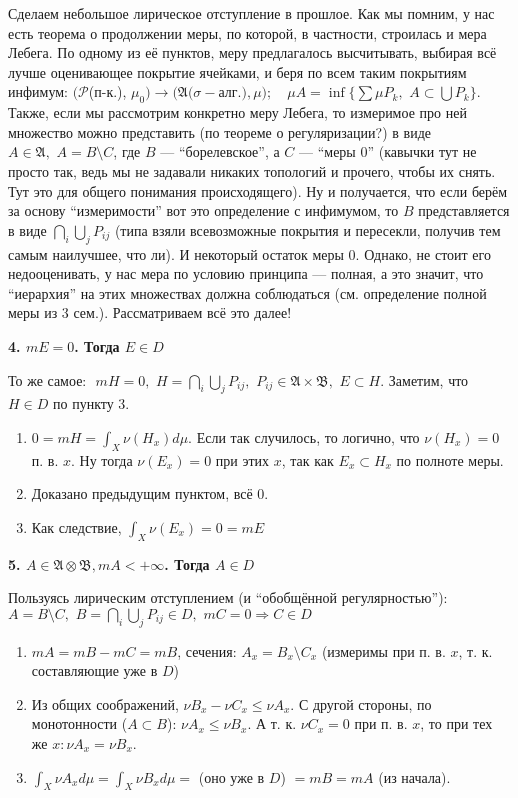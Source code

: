 \documentclass{article}
\def\dbl{\,\,}
\begin{document}
Сделаем небольшое лирическое отступление в прошлое. Как мы помним, у нас есть теорема о продолжении меры, по которой, в частности, строилась и мера Лебега. По одному из её пунктов, меру предлагалось высчитывать, выбирая всё лучше оценивающее покрытие ячейками, и беря по всем таким покрытиям инфимум: $(\mathcal{P} $(п-к.), $\mu_0) \rightarrow (\mathfrak{A} (\sigma-$алг.$), \mu); \quad \mu A = \inf \{\sum \mu P_k, \dbl A \subset \bigcup P_k\}$. Также, если мы рассмотрим конкретно меру Лебега, то измеримое про ней множество можно представить (по теореме о регуляризации?) в виде $A \in \mathfrak{A}, \dbl A = B \setminus C$, где $B$ --- ``борелевское'', а $C$ --- ``меры 0'' (кавычки тут не просто так, ведь мы не задавали никаких топологий и прочего, чтобы их снять. Тут это для общего понимания происходящего). Ну и получается, что если берём за основу ``измеримости'' вот это определение с инфимумом, то $B$ представляется в виде $\bigcap_i \bigcup_j P_{ij}$ (типа взяли всевозможные покрытия и пересекли, получив тем самым наилучшее, что ли). И некоторый остаток меры 0. Однако, не стоит его недооценивать, у нас мера по условию принципа --- полная, а это значит, что ``иерархия'' на этих множествах должна соблюдаться (см. определение полной меры из 3 сем.). Рассматриваем всё это далее!

\textbf{4. $mE = 0$. Тогда $E \in D$}

То же самое: $\dbl mH = 0, \dbl H = \bigcap_i \bigcup_j P_{ij}, \dbl P_{ij} \in \mathfrak{A} \times \mathfrak{B}, \dbl E \subset H$. Заметим, что $H \in D$ по пункту 3.

\begin{enumerate}
    \item $0 = mH = \int_{X} \nu (H_x) d\mu$. Если так случилось, то логично, что $\nu(H_x) = 0$ п. в. $x$. Ну тогда $\nu(E_x) = 0$ при этих $x$, так как $E_x \subset H_x$ по полноте меры. 
    \item Доказано предыдущим пунктом, всё 0.
    \item Как следствие, $\int_{X} \nu (E_x) = 0 = mE$
\end{enumerate}

\textbf{5. $A \in \mathfrak{A} \otimes \mathfrak{B}, mA < + \infty$. Тогда $A \in D$}

Пользуясь лирическим отступлением (и ``обобщённой регулярностью''): $A = B \setminus C, \dbl B = \bigcap_{i} \bigcup_{j} P_{ij} \in D, \dbl mC = 0 \Rightarrow C \in D$

\begin{enumerate}
    \item $mA = mB - mC = mB$, сечения: $A_x = B_x \setminus C_x$ (измеримы при п. в. $x$, т. к. составляющие уже в $D$)
    \item Из общих соображений, $\nu B_x - \nu C_x \le \nu A_x$. С другой стороны, по монотонности ($A \subset B$): $\nu A_x \le \nu B_x$. А т. к. $\nu C_x = 0$ при п. в. $x$, то при тех же $x: \nu A_x = \nu B_x$.
    \item $\int_{X} \nu A_x d\mu = \int_{X} \nu B_x d\mu = $ (оно уже в $D$) $ = mB = mA$ (из начала).
\end{enumerate}
\end{document}
